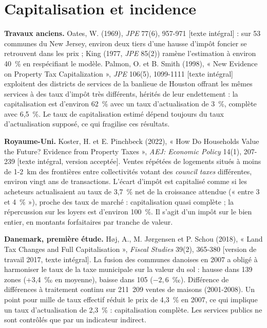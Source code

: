 \documentclass[11pt,a4paper]{article}
\newcommand{\lu}[1]{{\footnotesize\color{ocre}[#1]}}
\begin{document}
\section{Capitalisation et incidence}

\textbf{Travaux anciens.} Oates, W. (1969), \emph{JPE} 77(6), 957-971 \lu{texte intégral} : sur
53 communes du New Jersey, environ deux tiers d'une hausse d'impôt foncier se retrouvent dans les
prix ; King (1977, \emph{JPE} 85(2)) ramène l'estimation à environ 40~\% en respécifiant le modèle.
Palmon, O. et B. Smith (1998), « New Evidence on Property Tax Capitalization », \emph{JPE} 106(5),
1099-1111 \lu{texte intégral} exploitent des districts de services de la banlieue de Houston
offrant les mêmes services à des taux d'impôt très différents, hérités de leur endettement : la
capitalisation est d'environ 62~\% avec un taux d'actualisation de 3~\%, complète avec 6,5~\%.
Le taux de capitalisation estimé dépend toujours du taux d'actualisation supposé, ce qui fragilise
ces résultats.

\textbf{Royaume-Uni.} Koster, H. et E. Pinchbeck (2022), « How Do Households Value the Future?
Evidence from Property Taxes », \emph{AEJ: Economic Policy} 14(1), 207-239 \lu{texte intégral,
version acceptée}. Ventes répétées de logements situés à moins de 1-2~km des frontières entre
collectivités votant des \emph{council taxes} différentes, environ vingt ans de transactions.
L'écart d'impôt est capitalisé comme si les acheteurs actualisaient au taux de 3,7~\% net de la
croissance attendue (« entre 3 et 4~\% »), proche des taux de marché : capitalisation quasi
complète ; la répercussion sur les loyers est d'environ 100~\%. Il s'agit d'un impôt sur le bien
entier, en montants forfaitaires par tranche de valeur.

\textbf{Danemark, première étude.} Høj, A., M. Jørgensen et P. Schou (2018), « Land Tax Changes and
Full Capitalisation », \emph{Fiscal Studies} 39(2), 365-380 \lu{version de travail 2017, texte
intégral}. La fusion des communes danoises en 2007 a obligé à harmoniser le taux de la taxe
municipale sur la valeur du sol : hausse dans 139 zones (+3,4~‰ en moyenne), baisse dans 105
($-2{,}6$~‰). Différence de différences à traitement continu sur 211~209 ventes de maisons
(2001-2008). Un point pour mille de taux effectif réduit le prix de 4,3~\% en 2007, ce qui implique
un taux d'actualisation de 2,3~\% : capitalisation complète. Les services publics ne sont
contrôlés que par un indicateur indirect.
\end{document}
